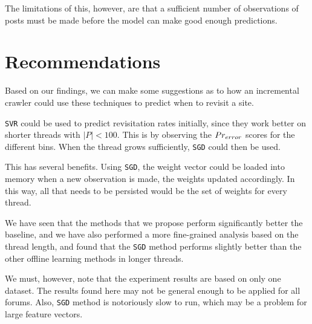 The limitations of this, however, are that a sufficient number of observations 
of posts must be made before the model can make good enough predictions.

\section{Recommendations}
Based on our findings, we can make some suggestions as to how an incremental 
crawler could use these techniques to predict when to revisit a site.

\texttt{SVR} could be used to predict revisitation rates initially, since they 
work better on shorter threads with $|P| < 100$. This is by observing the 
$Pr_{error}$ scores for the different bins. When the thread grows sufficiently, 
\texttt{SGD} could then be used.

This has several benefits.
Using \texttt{SGD}, the weight vector could be loaded into memory when a new 
observation is made, the weights updated accordingly. In this way, all that 
needs to be persisted would be the set of weights for every thread.

We have seen that the methods that we propose perform significantly better the 
baseline, and we have also performed a more fine-grained analysis based on the 
thread length, and found that the \texttt{SGD} method performs slightly better 
than the other offline learning methods in longer threads.

We must, however, note that the experiment results are based on only one 
dataset.  The results found here may not be general enough to be applied for all 
forums.  Also, \texttt{SGD} method is notoriously slow to run, which may be a 
problem for large feature vectors.

